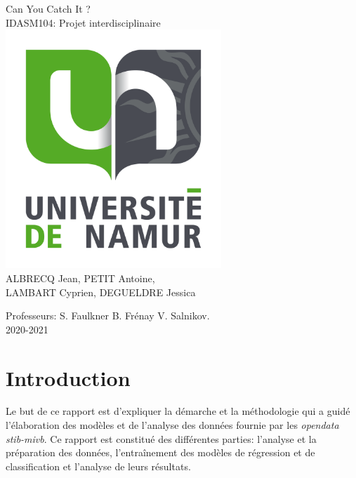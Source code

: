 \documentclass[12pt]{report}
\begin{document}
\begin{titlepage}
    \begin{sffamily}
    \begin{center}
    \Huge Can You Catch It ?
    \normalsize \\ IDASM104: Projet interdisciplinaire \\[0.5cm]

    \includegraphics[height=9cm]{images/unamur.png}
    \\[2cm]

    
    ALBRECQ Jean, PETIT Antoine, \\ LAMBART Cyprien, DEGUELDRE Jessica
    \\[0.5cm]

    \vfill

    {\large Professeurs: S. Faulkner B. Frénay V. Salnikov. \\ 2020-2021}
    
    \end{center}
    \end{sffamily}
\end{titlepage}
\newpage

\tableofcontents
\newpage

\chapter{Introduction}
Le but de ce rapport est d'expliquer la démarche et la méthodologie qui a guidé l'élaboration des modèles et de l'analyse des données fournie par les \textit{opendata stib-mivb}. Ce rapport est constitué des différentes parties: l'analyse et la préparation des données, l'entraînement des modèles de régression et de classification et l'analyse de leurs résultats.
\end{document}
